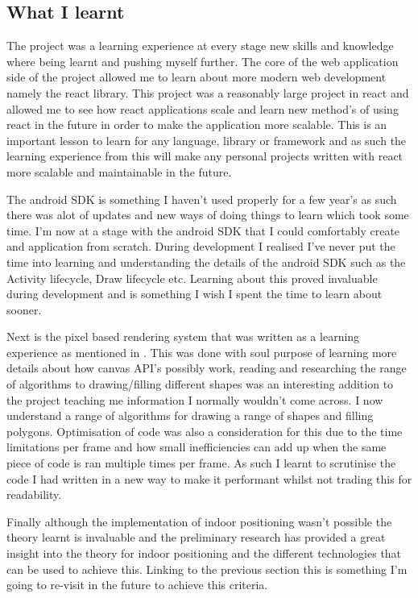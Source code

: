 \subsection{What I learnt} %
The project was a learning experience at every stage new skills and knowledge where being learnt and pushing myself further. The core of the web application side of the project allowed me to learn about more modern web development namely the react library. This project was a reasonably large project in react and allowed me to see how react applications scale and learn new method's of using react in the future in order to make the application more scalable. This is an important lesson to learn for any language, library or framework and as such the learning experience from this will make any personal projects written with react more scalable and maintainable in the future.

The android SDK is something I haven't used properly for a few year's as such there was alot of updates and new ways of doing things to learn which took some time. I'm now at a stage with the android SDK that I could comfortably create and application from scratch. During development I realised I've never put the time into learning and understanding the details of the android SDK such as the Activity lifecycle, Draw lifecycle etc. Learning about this proved invaluable during development and is something I wish I spent the time to learn about sooner.

Next is the pixel based rendering system that was written as a learning experience as mentioned in \citetemp. This was done with soul purpose of learning more details about how canvas API's possibly work, reading and researching the range of algorithms to drawing/filling different shapes was an interesting addition to the project teaching me information I normally wouldn't come across. I now understand a range of algorithms for drawing a range of shapes and filling polygons. Optimisation of code was also a consideration for this due to the time limitations per frame and how small inefficiencies can add up when the same piece of code is ran multiple times per frame. As such I learnt to scrutinise the code I had written in a new way to make it performant whilst not trading this for readability.

Finally although the implementation of indoor positioning wasn't possible the theory learnt is invaluable and the preliminary research has provided a great insight into the theory for indoor positioning and the different technologies that can be used to achieve this. Linking to the previous section this is something I'm going to re-visit in the future to achieve this criteria.

